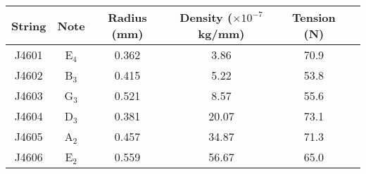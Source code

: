 \begin{tabular}{cccccc}
\toprule
String & Note & Radius (mm) & Density ($\times 10^{-7}$ kg/mm) & Tension (N) \\
\midrule
J4601 & E$_{4}$ & 0.362 & 3.86 & 70.9 \\
J4602 & B$_{3}$ & 0.415 & 5.22 & 53.8 \\
J4603 & G$_{3}$ & 0.521 & 8.57 & 55.6 \\
J4604 & D$_{3}$ & 0.381 & 20.07 & 73.1 \\
J4605 & A$_{2}$ & 0.457 & 34.87 & 71.3 \\
J4606 & E$_{2}$ & 0.559 & 56.67 & 65.0 \\
\bottomrule
\end{tabular}

